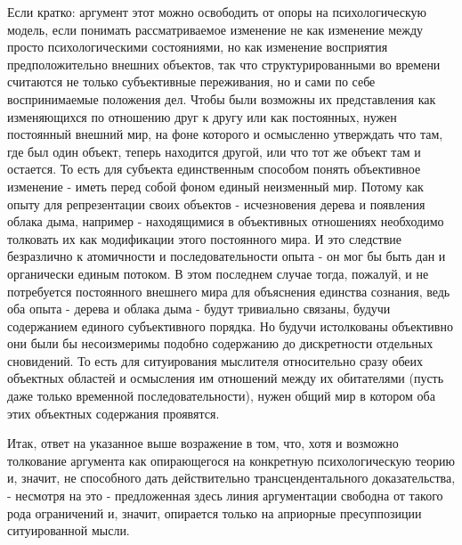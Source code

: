 \documentclass{article}
\begin{document}
Если кратко: аргумент этот можно освободить от опоры на психологическую модель, если понимать рассматриваемое изменение не как изменение между просто психологическими состояниями, но как изменение восприятия предположительно внешних объектов, так что структурированными во времени считаются не только субъективные переживания, но и сами по себе воспринимаемые положения дел. Чтобы были возможны их представления как изменяющихся по отношению друг к другу или как постоянных, нужен постоянный внешний мир, на фоне которого и осмысленно утверждать что там, где был один объект, теперь находится другой, или что тот же объект там и остается. То есть для субъекта единственным способом понять объективное изменение - иметь перед собой фоном единый неизменный мир. Потому как опыту для репрезентации своих объектов - исчезновения дерева и появления облака дыма, например - находящимися в объективных отношениях необходимо толковать их как модификации этого постоянного мира. И это следствие безразлично к атомичности и последовательности опыта - он мог бы быть дан и органически единым потоком. В этом последнем случае тогда, пожалуй, и не потребуется постоянного внешнего мира для объяснения единства сознания, ведь оба опыта - дерева и облака дыма - будут тривиально связаны, будучи содержанием единого субъективного порядка. Но будучи истолкованы объективно они были бы несоизмеримы подобно содержанию до дискретности отдельных сновидений. То есть для ситуирования мыслителя относительно сразу обеих объектных областей и осмысления им отношений между их обитателями (пусть даже только временной последовательности), нужен общий мир в котором оба этих объектных содержания проявятся.

Итак, ответ на указанное выше возражение в том, что, хотя и возможно толкование аргумента как опирающегося на конкретную психологическую теорию и, значит, не способного дать действительно трансцендентального доказательства, - несмотря на это - предложенная здесь линия аргументации свободна от такого рода ограничений и, значит, опирается только на априорные пресуппозиции ситуированной мысли.
\end{document}
